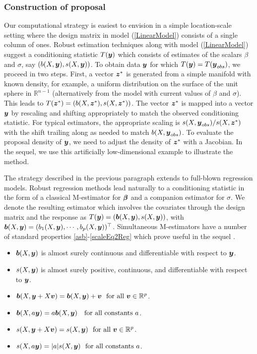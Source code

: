 \documentclass[12pt]{article}
\makeatletter
\def\bbeta{\mbox{\boldmath $\beta$}}
\newcommand{\by}{\mbox{\boldmath $y$}}
\newcommand{\bz}{\mbox{\boldmath $z$}}
\newcommand{\bv}{\mbox{\boldmath $v$}}
\newcommand{\bb}{\mbox{\boldmath $b$}}
\newcommand{\labitem}[2]{%
\def\@itemlabel{\textbf{#1}{.}}
\item
\def\@currentlabel{#1}\label{#2}}
\makeatother
\begin{document}
\subsubsection{Construction of proposal}
Our computational strategy is easiest to envision in a simple location-scale setting where 
the design matrix in model (\ref{LinearModel}) consists of a single column of ones.  Robust estimation techniques along
with model (\ref{LinearModel}) suggest a conditioning statistic $T(\by)$ which consists of
estimates of the scalars $\beta$ and $\sigma$, say $(b(X,\by), s(X,\by))$.  To 
obtain data $\by$ for which $T(\by) = T(\by_{obs})$, we proceed in two
steps.  
First, a vector $\bz^*$ is generated from a simple manifold with known
density, for example, a uniform distribution
on the surface of the unit sphere in ${\mathbb R}^{n-1}$ (alternatively from
the model with current values of $\beta$ and $\sigma$).  This leads to 
$T(\bz^*) = (b(X,\bz^*), s(X,\bz^*))$.  The vector $\bz^*$ is mapped into a vector
$\by$ by rescaling and shifting appropriately to match the observed conditioning statistic.  For typical estimators, the appropriate scaling is 
$s(X,\by_{obs}) / s(X,\bz^*)$ with the shift trailing along as needed to match $b(X,\by_{obs})$.  
To evaluate the proposal density of $\by$,
we need to adjust the density of $\bz^*$ with a Jacobian.  In the sequel, we use this artificially low-dimensional
example to illustrate the method.  

The strategy described in the previous paragraph extends to full-blown regression models.  Robust regression methods lead naturally to a conditioning statistic in the form of a classical M-estimator for $\bbeta$
and a companion estimator for $\sigma$.  We denote the resulting estimator which involves the covariates through
the design matrix and the response
as $T(\by) = (\bb(X,\by), s(X,\by))$, with $\bb(X,\by) = (b_1(X,\by), \cdots,
b_p(X,\by))^\top$.  Simultaneous M-estimators have a number of standard properties \ref{asb}-\ref{scaleEq2Reg} which
prove useful in the sequel \citep{huber2009, maronna2006}.  
\begin{itemize}
\labitem{C3}{asb}$\bb(X,\by)$ is almost surely continuous and differentiable with respect to $\by$.  
\labitem{C4}{as} $s(X,\by)$ is almost surely positive, continuous, and differentiable with respect to $\by$.  
\labitem{C5}{regEq} $\bb(X,\by+X\bv)=\bb(X,\by)+\bv \ \ \text{for  all}\ \bv\in\mathbb{R}^p$. 
\labitem{C6}{scaleEqReg} $\bb(X,a\by)=a\bb(X,\by)\ \ \ \text{for all constants } a$.  
\labitem{C7}{regIn} $s(X,\by+X\bv)=s(X,\by) \ \ \text{for all}\ \bv\in\mathbb{R}^p$.  
\labitem{C8}{scaleEq2Reg} $s(X, a\by)=|a|s(X,\by) \ \ \text{for all constants } a$.  
\end{itemize}
\end{document}
